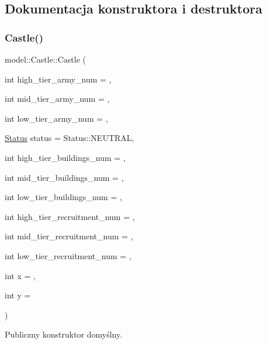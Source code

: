 \subsection{Dokumentacja konstruktora i destruktora}
\mbox{\label{classmodel_1_1Castle_a26e1b6313f73e34d1babd517f5d56c1f}} 
\subsubsection{\texorpdfstring{Castle()}{Castle()}\hspace{0.1cm}{\footnotesize\ttfamily [1/2]}}
{\footnotesize\ttfamily model\+::\+Castle\+::\+Castle (\begin{DoxyParamCaption}\item[{int}]{high\+\_\+tier\+\_\+army\+\_\+num = {},  }\item[{int}]{mid\+\_\+tier\+\_\+army\+\_\+num = {},  }\item[{int}]{low\+\_\+tier\+\_\+army\+\_\+num = {},  }\item[{\hyperlink{status_8hpp_a822822ece62ee330ee656034849df887}{Status}}]{status = {\ttfamily Status\+:\+:NEUTRAL},  }\item[{int}]{high\+\_\+tier\+\_\+buildings\+\_\+num = {},  }\item[{int}]{mid\+\_\+tier\+\_\+buildings\+\_\+num = {},  }\item[{int}]{low\+\_\+tier\+\_\+buildings\+\_\+num = {},  }\item[{int}]{high\+\_\+tier\+\_\+recruitment\+\_\+num = {},  }\item[{int}]{mid\+\_\+tier\+\_\+recruitment\+\_\+num = {},  }\item[{int}]{low\+\_\+tier\+\_\+recruitment\+\_\+num = {},  }\item[{int}]{x = {},  }\item[{int}]{y = {} }\end{DoxyParamCaption})\hspace{0.3cm}{\ttfamily [inline]}}



Publiczny konstruktor domyślny. 


